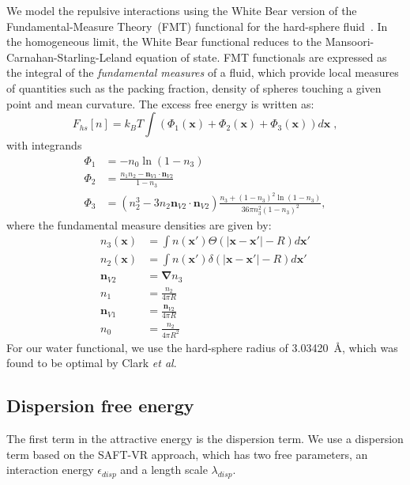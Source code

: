 \documentclass[letterpaper,twocolumn,amsmath,amssymb,prb]{revtex4-1}
\newcommand{\xx}{\textbf{x}}
\begin{document}
We model the repulsive interactions using the White Bear version of
the Fundamental-Measure Theory~(FMT) functional for the hard-sphere
fluid~\cite{roth2002whitebear}.  In the homogeneous limit, the White
Bear functional reduces to the Mansoori-Carnahan-Starling-Leland
equation of state.  FMT functionals are expressed as the integral of
the \emph{fundamental measures} of a fluid, which provide local
measures of quantities such as the packing fraction, density of
spheres touching a given point and mean curvature.  The excess free
energy is written as:
\begin{equation}
F_{hs}[n] = k_B T \int (\Phi_1(\xx) + \Phi_2(\xx) + \Phi_3(\xx)) d\xx \; ,
\end{equation}
with integrands
\begin{align}
\Phi_1 &= -n_0 \ln\left( 1 - n_3\right)\\
\Phi_2 &= \frac{n_1 n_2 - \mathbf{n}_{V1} \cdot\mathbf{n}_{V2}}{1-n_3} \\
\Phi_3 &= (n_2^3 - 3n_2 \mathbf{n}_{V2} \cdot \mathbf{n}_{V2})
  \frac{
    n_3 + (1-n_3)^2\ln(1-n_3)
  }{
    36\pi n_3^2\left( 1 - n_3 \right)^2
  } ,
\end{align}
where the fundamental measure densities are given by:
\begin{align}
  n_3(\xx) &= \int n(\xx') \Theta(\left|\xx - \xx'\right| - R) d\xx' \\
  n_2(\xx) &= \int n(\xx') \delta(\left|\xx - \xx'\right| - R) d\xx'
  \\
  \mathbf{n}_{V2} &= \mathbf{\nabla} n_3 \\
  n_1 &= \frac{n_2}{4\pi R}\\
  \mathbf{n}_{V1} &= \frac{\mathbf{n}_{V2}}{4\pi R}\\
  n_0 &= \frac{n_2}{4\pi R^2}
\end{align}
For our water functional, we use the hard-sphere radius of
3.03420~\AA, which was found to be optimal by Clark
\emph{et al}.\cite{clark2006developing}

\subsection{Dispersion free energy}
The first term in the attractive energy is the dispersion term.  We use a
dispersion term based on the SAFT-VR
approach\cite{gil-villegas-1997-SAFT-VR}, which has two free
parameters, an interaction energy $\epsilon_\textit{disp}$ and a
length scale $\lambda_\textit{disp}$.
\end{document}
